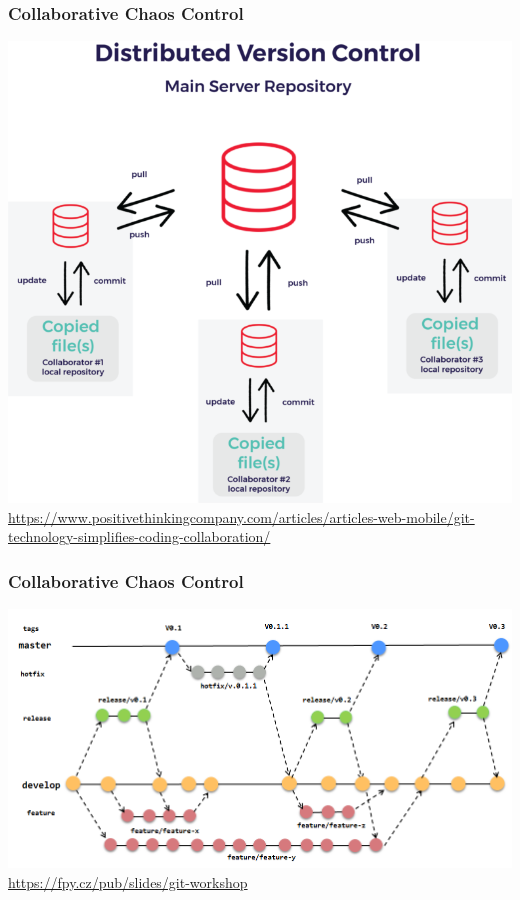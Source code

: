 \documentclass[
t, %
10pt, %
aspectratio=1610, %
ngerman,
english,
]{beamer}
\begin{document}
\begin{frame}
    \frametitle{Collaborative Chaos Control}
    \centering
    \includegraphics[height=0.7\textheight]{graphics/DVC-distributed-version-control-768x704.png}\\
    \url{https://www.positivethinkingcompany.com/articles/articles-web-mobile/git-technology-simplifies-coding-collaboration/}
\end{frame}

\begin{frame}
    \frametitle{Collaborative Chaos Control}
    \centering
    \includegraphics[height=0.7\textheight]{graphics/gitflow.png}\\
    \url{https://fpy.cz/pub/slides/git-workshop}
\end{frame}
\end{document}
